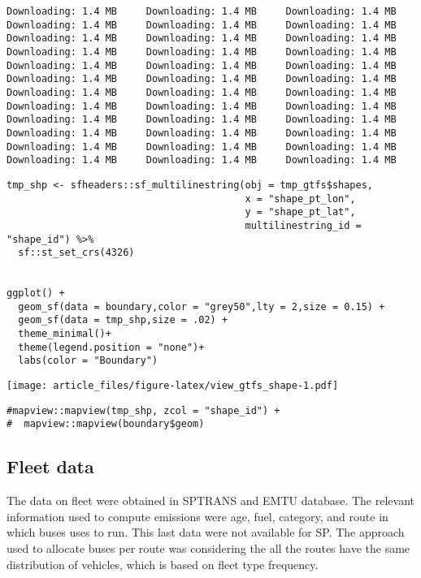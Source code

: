 \documentclass[gc, manuscript]{copernicus}
\begin{document}
\begin{verbatim}
Downloading: 1.4 MB     Downloading: 1.4 MB     Downloading: 1.4 MB     Downloading: 1.4 MB     Downloading: 1.4 MB     Downloading: 1.4 MB     Downloading: 1.4 MB     Downloading: 1.4 MB     Downloading: 1.4 MB     Downloading: 1.4 MB     Downloading: 1.4 MB     Downloading: 1.4 MB     Downloading: 1.4 MB     Downloading: 1.4 MB     Downloading: 1.4 MB     Downloading: 1.4 MB     Downloading: 1.4 MB     Downloading: 1.4 MB     Downloading: 1.4 MB     Downloading: 1.4 MB     Downloading: 1.4 MB     Downloading: 1.4 MB     Downloading: 1.4 MB     Downloading: 1.4 MB     Downloading: 1.4 MB     Downloading: 1.4 MB     Downloading: 1.4 MB     Downloading: 1.4 MB     Downloading: 1.4 MB     Downloading: 1.4 MB     Downloading: 1.4 MB     Downloading: 1.4 MB     Downloading: 1.4 MB     Downloading: 1.4 MB     Downloading: 1.4 MB     Downloading: 1.4 MB
\end{verbatim}

\begin{verbatim}
tmp_shp <- sfheaders::sf_multilinestring(obj = tmp_gtfs$shapes,
                                         x = "shape_pt_lon",
                                         y = "shape_pt_lat",
                                         multilinestring_id = "shape_id") %>%
  sf::st_set_crs(4326)


ggplot() +
  geom_sf(data = boundary,color = "grey50",lty = 2,size = 0.15) +
  geom_sf(data = tmp_shp,size = .02) +
  theme_minimal()+
  theme(legend.position = "none")+
  labs(color = "Boundary")
\end{verbatim}

\texttt{[image: article\_files/figure-latex/view\_gtfs\_shape-1.pdf]}

\begin{verbatim}
#mapview::mapview(tmp_shp, zcol = "shape_id") +
#  mapview::mapview(boundary$geom)
\end{verbatim}

\subsection{Fleet data}

The data on fleet were obtained in SPTRANS and EMTU database. The
relevant information used to compute emissions were age, fuel, category,
and route in which buses uses to run. This last data were not available
for SP. The approach used to allocate buses per route was considering
the all the routes have the same distribution of vehicles, which is
based on fleet type frequency.
\end{document}
